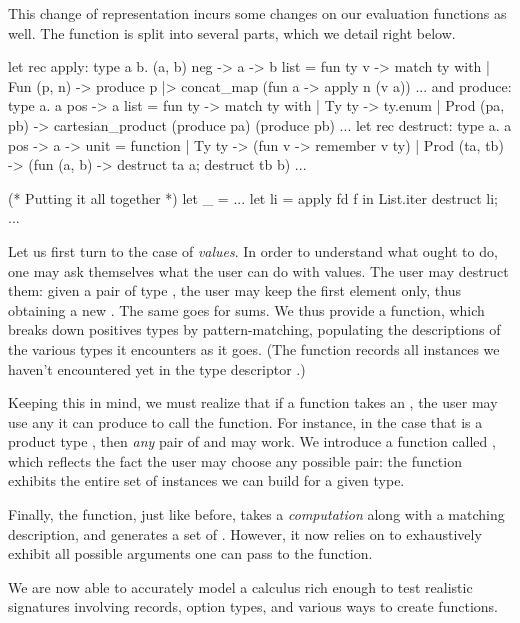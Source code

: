 This change of representation incurs some changes on our evaluation functions
as well. The  function is split into several parts, which we detail
right below.
%
\begin{ocamlcode}
let rec apply: type a b. (a, b) neg -> a -> b list =
  fun ty v -> match ty with
  | Fun (p, n) ->
      produce p |> concat_map (fun a -> apply n (v a))
  ...
and produce: type a. a pos -> a list =
  fun ty -> match ty with
  | Ty ty -> ty.enum
  | Prod (pa, pb) ->
      cartesian_product (produce pa) (produce pb)
  ...
let rec destruct: type a. a pos -> a -> unit =
  function
  | Ty ty -> (fun v ->
      remember v ty)
  | Prod (ta, tb) -> (fun (a, b) ->
      destruct ta a;
      destruct tb b)
  ...

(* Putting it all together *)
let _ =
  ...
  let li = apply fd f in
  List.iter destruct li;
  ...
\end{ocamlcode}
%
Let us first turn to the case of \emph{values}. In order to understand what \arti
ought to do, one may ask themselves what the user can do with values. The user
may destruct them: given a pair of type , the user may keep
the first element only, thus obtaining a new . The same goes for sums. We
thus provide a  function, which breaks down positives types by
pattern-matching, populating the descriptions of the various types it encounters
as it goes. (The  function records all instances we haven't
encountered yet in the type descriptor .)

Keeping this in mind, we must realize that if a function takes an , the
user may use any  it can produce to call the function. For instance, in
the case that  is a product type , then \emph{any} pair
of  and  may work.  We introduce a function called
, which reflects the fact the user may choose any possible pair:
the function exhibits the entire set of instances we can build for a given type.

Finally, the  function, just like before, takes a \emph{computation}
along with a matching description, and generates a set of . However, it
now relies on  to exhaustively exhibit all possible arguments one
can pass to the function.

We are now able to accurately model a calculus rich enough to test realistic
signatures involving records, option types, and various ways to create
functions.

